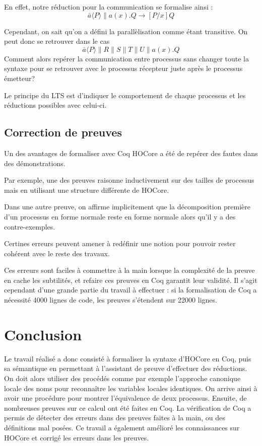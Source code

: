 \documentclass[11pt]{article}
\begin{document}
En effet, notre réduction pour la communication se formalise ainsi :
$$\bar{a}\langle P\rangle\|a(x).Q \rightarrow [P/x]Q$$

Cependant, on sait qu'on a défini la parallèlisation comme étant transitive. On peut donc se retrouver dans le cas
$$\bar{a}\langle P\rangle\|R\|S\|T\|U\|a(x).Q$$
Comment alors repérer la communication entre processus sans changer toute la syntaxe pour se retrouver avec le processus récepteur juste après le processus émetteur?

Le principe du LTS est d'indiquer le comportement de chaque processus et les réductions possibles avec celui-ci.%




\subsection{Correction de preuves}
Un des avantages de formaliser avec Coq HOCore a été de repérer des fautes dans des démonstrations.

Par exemple, une des preuves raisonne inductivement sur des tailles de processus mais en utilisant une structure différente de HOCore.

Dans une autre preuve, on affirme implicitement que la décomposition première d'un processus en forme normale reste en forme normale alors qu'il y a des contre-exemples.

Certines erreurs peuvent amener à redéfinir une notion pour pouvoir rester cohérent avec le reste des travaux.

Ces erreurs sont faciles à commettre à la main lorsque la complexité de la preuve en cache les subtilités, et refaire ces preuves en Coq garantit leur validité. Il s'agit cependant d'une grande partie du travail à effectuer : si la formalisation de Coq a nécessité 4000 lignes de code, les preuves s'étendent sur 22000 lignes. 

\section{Conclusion}
Le travail réalisé a donc consisté à formaliser la syntaxe d'HOCore en Coq, puis sa sémantique en permettant à l'assistant de preuve d'effectuer des réductions. %
On doit alors utiliser des procédés comme par exemple l'approche canonique locale des noms pour reconnaître les variables locales identiques.
On arrive ainsi à avoir une procédure pour montrer l'équivalence de deux processus. %
Ensuite, de nombreuses preuves sur ce calcul ont été faites en Coq. La vérification de Coq a permis de détecter des erreurs dans des preuves faites à la main, ou des définitions mal posées. Ce travail a également amélioré les connaissances sur HOCore et corrigé les erreurs dans les preuves.
\end{document}
